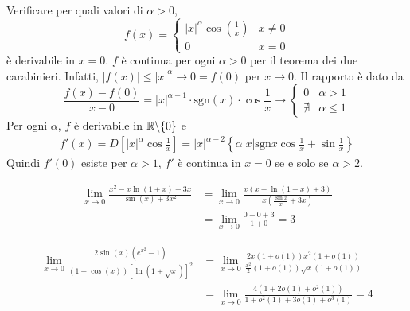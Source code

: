 \documentclass[a4paper]{article}
\begin{document}
\begin{snippetexample}{}
    Verificare per quali valori di \(\alpha>0\),
    \[
        f(x) = \begin{cases}
            {|x|}^\alpha \cos\left(\frac{1}{x}\right) & x \neq 0 \\
            0 & x=0
        \end{cases}
    \]
    è derivabile in \(x=0\). \(f\) è continua per ogni \(\alpha>0\) per il teorema dei due carabinieri.
    Infatti, \(|f(x)| \leq {|x|}^\alpha \to 0 = f(0)\) per \(x\to 0\).
    Il rapporto è dato da
    \[
        \frac{f(x) - f(0)}{x-0} = {|x|}^{\alpha - 1} \cdot \text{sgn}(x) \cdot \cos\frac{1}{x}
        \to \begin{cases}
            0 & \alpha > 1 \\
            \nexists & \alpha \leq 1
        \end{cases}
    \]
    Per ogni \(\alpha\), \(f\) è derivabile in \(\mathbb{R} \backslash \{0\}\) e \begin{align*}
        f'(x) = D[{|x|}^\alpha \cos\frac{1}{x}]
        = {|x|}^{\alpha - 2} \left\{
            \alpha {|x|} \text{sgn} x \cos\frac{1}{x} + \sin\frac{1}{x}
        \right\}
    \end{align*}
    Quindi \(f'(0)\) esiste per \(\alpha>1\), \(f'\) è continua in \(x=0\) se e solo se \(\alpha > 2\).
\end{snippetexample}

\begin{snippetexercise}{}
    \begin{align*}
        \lim_{x\to 0} \frac{x^2 - x\ln(1 + x) + 3x}{\sin(x) + 3x^2}
        &= \lim_{x\to 0} \frac{x(x - \ln(1 + x) + 3)}{x(\frac{\sin x}{x} + 3x)} \\
        &= \lim_{x\to 0} \frac{0-0+3}{1 + 0} = 3
    \end{align*}
\end{snippetexercise}

\begin{snippetexercise}{}
    \begin{align*}
        \lim_{x\to 0} \frac{2\sin (x) \left(e^{x^2} - 1\right)}{(1-\cos(x)){\left[\ln(1 + \sqrt{x})\right]}^2}
        &= \lim_{x\to 0} \frac{
            2x(1 + o(1))x^2(1 + o(1))
        }{
            \frac{x^2}{2}(1 + o(1)) \sqrt{x}(1 + o(1))
        } \\
        &= \lim_{x\to 0} \frac{4(1 + 2o(1) + o^2(1))}{1 + o^2(1) + 3o(1) + o^3(1)} = 4
    \end{align*}
\end{snippetexercise}
\end{document}
